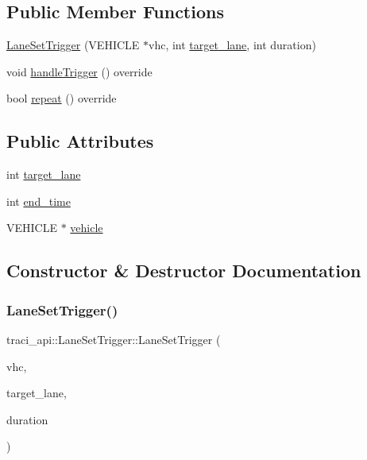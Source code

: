 \subsection*{Public Member Functions}
\begin{DoxyCompactItemize}
\item 
\hyperlink{classtraci__api_1_1_lane_set_trigger_a2af85a3a539f5a6c0624085c90cd6fa8}{Lane\+Set\+Trigger} (V\+E\+H\+I\+C\+LE $\ast$vhc, int \hyperlink{classtraci__api_1_1_lane_set_trigger_ad39b2db18176f0a7d40da0bb3878e519}{target\+\_\+lane}, int duration)
\item 
void \hyperlink{classtraci__api_1_1_lane_set_trigger_a9bc702339daf8aa0d905e3bab5ff2dc3}{handle\+Trigger} () override
\item 
bool \hyperlink{classtraci__api_1_1_lane_set_trigger_ae606560cb760e12b0f1a86407f614e18}{repeat} () override
\end{DoxyCompactItemize}
\subsection*{Public Attributes}
\begin{DoxyCompactItemize}
\item 
int \hyperlink{classtraci__api_1_1_lane_set_trigger_ad39b2db18176f0a7d40da0bb3878e519}{target\+\_\+lane}
\item 
int \hyperlink{classtraci__api_1_1_lane_set_trigger_a20d2e675f6c1d69246daa42eeac0153c}{end\+\_\+time}
\item 
V\+E\+H\+I\+C\+LE $\ast$ \hyperlink{classtraci__api_1_1_lane_set_trigger_aec89039cf41fe086fc46c5748e9b933b}{vehicle}
\end{DoxyCompactItemize}


\subsection{Constructor \& Destructor Documentation}
\mbox{\label{classtraci__api_1_1_lane_set_trigger_a2af85a3a539f5a6c0624085c90cd6fa8}} 
\subsubsection{\texorpdfstring{Lane\+Set\+Trigger()}{LaneSetTrigger()}}
{\footnotesize\ttfamily traci\+\_\+api\+::\+Lane\+Set\+Trigger\+::\+Lane\+Set\+Trigger (\begin{DoxyParamCaption}\item[{V\+E\+H\+I\+C\+LE $\ast$}]{vhc,  }\item[{int}]{target\+\_\+lane,  }\item[{int}]{duration }\end{DoxyParamCaption})}

